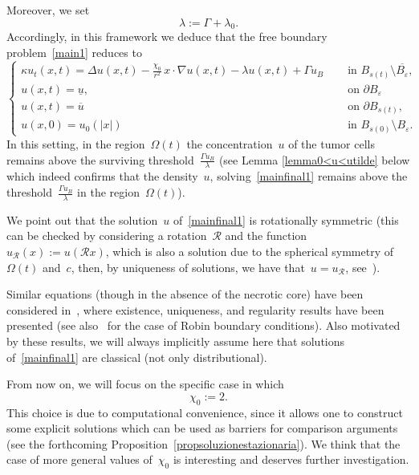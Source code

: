 \documentclass[12pt,a4paper,intlimits,sumlimits]{amsart}
\theoremstyle{definition}
\theoremstyle{plain}
\numberwithin{equation}{section}
\begin{document}
Moreover, we set
$$ \lambda:=\Gamma+\lambda_0.$$
Accordingly, in this framework we deduce that the free boundary problem~\eqref{main1} reduces to
\begin{equation}\label{mainfinal1}
\begin{cases}
\kappa u_t (x,t)= \Delta u(x, t) - \displaystyle\frac{\chi_0}{r^2}\, x\cdot\nabla u(x, t) -\lambda u(x, t)+ \Gamma u_B 
&\quad\mbox{ in }B_{s(t)}\setminus\overline{B_\varepsilon},\\
u(x, t) = \underline{u}, &\quad\mbox{ on } \partial B_\varepsilon \\
u(x, t) = \overline{u} &\quad\mbox{ on } \partial B_{s(t)}, \\
u(x, 0) = u_0(|x|) &\quad\mbox{ in } B_{s(0)}\setminus B_\varepsilon.
\end{cases}
\end{equation}
In this setting, in
the region~$\Omega(t)$
the concentration~$u$ of the tumor cells remains above the surviving
threshold~$\frac{\Gamma u_B}{\lambda}$
(see Lemma \ref{lemma0<u<utilde}
below which indeed confirms that the density~$u$,
solving~\eqref{mainfinal1}
remains above the threshold~$\frac{\Gamma u_B}{\lambda}$
in the region~$\Omega(t)$).

We point out that the solution~$u$ of~\eqref{mainfinal1} is rotationally symmetric (this can be checked by considering a rotation~${\mathcal{R}}$ and the function~$u_{{\mathcal{R}}}(x):=u({\mathcal{R}}x)$, which is also a solution due to the spherical symmetry of~$\Omega(t)$ and~$c$, then, by uniqueness of solutions, we have that~$u=u_{{\mathcal{R}}}$, see~\cite[Corollary~5.2]{MR1465184}).

Similar equations (though in the absence of the necrotic core) have been considered in~\cite{MR2176317}, where existence, uniqueness, and regularity results have been presented (see also~\cite{MR3950722} for the case of Robin boundary conditions). Also motivated by these results, we will always implicitly assume here that solutions of~\eqref{mainfinal1} are classical (not only distributional).

{F}rom now on, we will focus on the specific case in which
\begin{equation}\label{mainfinal1:DUE}
\chi_0:=2.
\end{equation}
This choice is due to computational convenience, since it allows one to construct some explicit solutions which
can be used as barriers for comparison arguments (see the forthcoming Proposition~\ref{propsoluzionestazionaria}).
We think that the case of more general values of~$\chi_0$ is interesting and deserves further investigation. 
\end{document}
